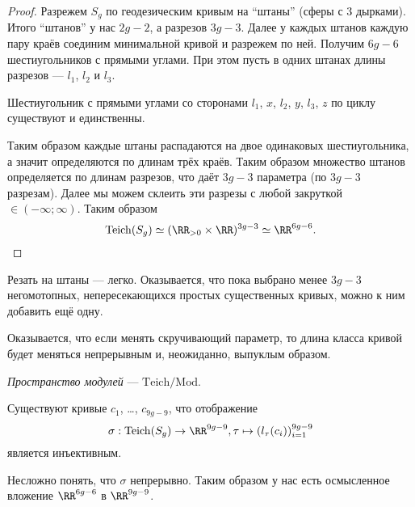 \documentclass[12pt,a4paper]{article}
\newcommand{\Mod}{\mathrm{Mod}}
\newcommand{\Teich}{\mathrm{Teich}}
\begin{document}
    \begin{proof}
        Разрежем $S_g$ по геодезическим кривым на ``штаны'' (сферы с 3 дырками). Итого ``штанов'' у нас $2g-2$, а разрезов $3g-3$. Далее у каждых штанов каждую пару краёв соединим минимальной кривой и разрежем по ней. Получим $6g-6$ шестиугольников с прямыми углами. При этом пусть в одних штанах длины разрезов --- $l_1$, $l_2$ и $l_3$.
        
        \begin{lemma}
            Шестиугольник с прямыми углами со сторонами $l_1$, $x$, $l_2$, $y$, $l_3$, $z$ по циклу существуют и единственны.
        \end{lemma}

        Таким образом каждые штаны распадаются на двое одинаковых шестиугольника, а значит определяются по длинам трёх краёв. Таким образом множество штанов определяется по длинам разрезов, что даёт $3g-3$ параметра (по $3g-3$ разрезам). Далее мы можем склеить эти разрезы с любой закруткой $\in (-\infty; \infty)$. Таким образом
        \[\Teich(S_g) \simeq (\RR_{>0} \times \RR)^{3g-3} \simeq \RR^{6g-6}.\]
    \end{proof}

    \begin{remark}
        Резать на штаны --- легко. Оказывается, что пока выбрано менее $3g-3$ негомотопных, непересекающихся простых существенных кривых, можно к ним добавить ещё одну.
    \end{remark}

    \begin{remark}
        Оказывается, что если менять скручивающий параметр, то длина класса кривой будет меняться непрерывным и, неожиданно, выпуклым образом.
    \end{remark}

    \begin{definition}
        \emph{Пространство модулей} --- $\Teich / \Mod$.
    \end{definition}

    \begin{theorem}[$9g-9$-теорема]
        Существуют кривые $c_1$, \dots, $c_{9g-9}$, что отображение
        \[\sigma: \Teich(S_g) \to \RR^{9g-9}, \tau \mapsto (l_\tau(c_i))_{i=1}^{9g-9}\]
        является инъективным. 
    \end{theorem}

    \begin{remark}
        Несложно понять, что $\sigma$ непрерывно. Таким образом у нас есть осмысленное вложение $\RR^{6g-6}$ в $\RR^{9g-9}$.
    \end{remark}
\end{document}
